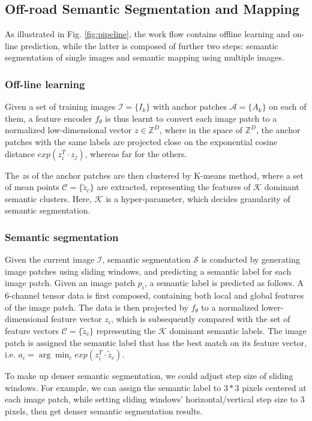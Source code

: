 \documentclass[letterpaper, 10 pt, conference]{ieeeconf}  %
\begin{document}
\subsection{Off-road Semantic Segmentation and Mapping}

As illustrated in Fig. \ref{fig:pipeline}, the work flow contains offline learning and on-line prediction, while the latter is composed of further two steps: semantic segmentation of single images and semantic mapping using multiple images.

\subsubsection{Off-line learning}
Given a set of training images $\mathcal{I}=\{I_k\}$ with anchor patches $\mathcal{A}=\{A_k\}$ on each of them, a feature encoder $f_\theta$ is thus learnt to convert each image patch to a normalized low-dimensional vector $z\in \mathbb{Z}^D$, where in the space of $\mathbb{Z}^D$, the anchor patches with the same labels are projected close on the exponential cosine distance $exp(z_i^T \cdot z_j)$, whereas far for the others.

The $z$s of the anchor patches are then clustered by K-means method, where a set of mean points $\mathcal{C}=\{\tilde{z}_c\}$ are extracted, representing the features of $\mathcal{K}$ dominant semantic clusters. Here, $\mathcal{K}$ is a hyper-parameter, which decides granularity of semantic segmentation.

\subsubsection{Semantic segmentation}

Given the current image $\mathcal{I}$, semantic segmentation $\mathcal{S}$ is conducted by generating image patches using sliding windows, and predicting a semantic label for each image patch.
Given an image patch $p_i$, a semantic label is predicted as follows. A 6-channel tensor data is first composed, containing both local and global features of the image patch. The data is then projected by $f_{\theta}$ to a normalized lower-dimensional feature vector $z_i$, which is subsequently compared with the set of feature vectors $\mathcal{C}=\{\tilde{z}_c\}$ representing the $\mathcal{K}$ dominant semantic labels. The image patch is assigned the semantic label that has the best match on its feature vector, i.e. $a_i = \arg\min_c exp(z_i^T \cdot \tilde{z}_c)$.

To make up denser semantic segmentation, we could adjust step size of sliding windows. For example, we can assign the semantic label to $3*3$ pixels centered at each image patch, while setting sliding windows' horizontal/vertical step size to 3 pixels, then get denser semantic segmentation results.
\end{document}
